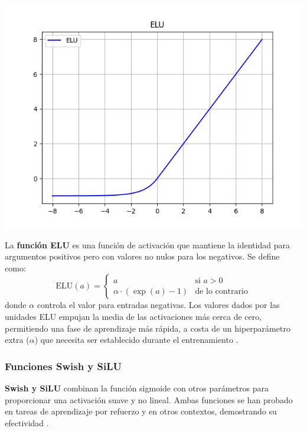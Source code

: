 \begin{minipage}{0.35\textwidth}
    \includegraphics[width=1.1\textwidth]{img/elu.png}
    \label{img:elu}
\end{minipage}
\begin{minipage}{0.05\textwidth}
\textbf{ }
\end{minipage}
\begin{minipage}{0.6\textwidth}
    La \textbf{función ELU} es una función de activación que mantiene la identidad para argumentos positivos pero con valores no nulos para los negativos. Se define como:
    \[
    \text{ELU}(a) =
    \begin{cases} 
    a & \text{si } a > 0 \\
    \alpha \cdot (\exp(a) - 1) & \text{de lo contrario}
    \end{cases}
    \]
    donde \( \alpha \) controla el valor para entradas negativas. Los valores dados por las unidades ELU empujan la media de las activaciones más cerca de cero, permitiendo una fase de aprendizaje más rápida, a costa de un hiperparámetro extra (\( \alpha \)) que necesita ser establecido durante el entrenamiento \citep{apicella2021survey}.
\end{minipage}


\subsubsection*{Funciones Swish y SiLU}

\textbf{Swish y SiLU} combinan la función sigmoide con otros parámetros para proporcionar una activación suave y no lineal. Ambas funciones se han probado en tareas de aprendizaje por refuerzo y en otros contextos, demostrando su efectividad \citep{apicella2021survey}.

